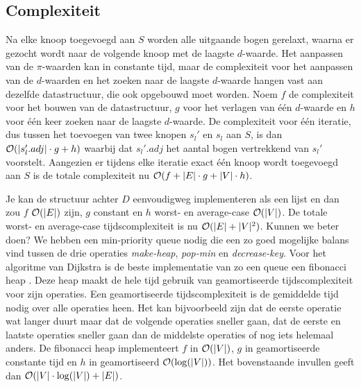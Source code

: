 \documentclass[conference]{IEEEtran}
\theoremstyle{definition}
\theoremstyle{remark}
\DeclarePairedDelimiter{\card}{\vert}{\vert}  %
\begin{document}
\subsection{Complexiteit}
Na elke knoop toegevoegd aan $S$ worden alle uitgaande bogen gerelaxt, waarna er gezocht wordt naar de volgende knoop met de laagste $d$-waarde. Het aanpassen van de $\pi$-waarden kan in constante tijd, maar de complexiteit voor het aanpassen van de $d$-waarden en het zoeken naar de laagste $d$-waarde hangen vast aan dezelfde datastructuur, die ook opgebouwd moet worden. Noem $f$ de complexiteit voor het bouwen van de datastructuur, $g$ voor het verlagen van één $d$-waarde en $h$ voor één keer zoeken naar de laagste $d$-waarde. De complexiteit voor één iteratie, dus tussen het toevoegen van twee knopen $s_l'$ en $s_l$ aan $S$, is dan $\mathcal{O}(\card{s_l'.adj} \cdot g + h)$ waarbij dat $s_l'.adj$ het aantal bogen vertrekkend van $s_l'$ voorstelt. Aangezien er tijdens elke iteratie exact één knoop wordt toegevoegd aan $S$ is de totale complexiteit nu $\mathcal{O}(f + \card{E} \cdot g + \card{V} \cdot h)$.

Je kan de structuur achter $D$ eenvoudigweg implementeren als een lijst en dan zou $f$ $\mathcal{O}(\card{E})$ zijn, $g$ constant en $h$ worst- en average-case $\mathcal{O}(\card{V})$. De totale worst- en average-case tijdscomplexiteit is nu $\mathcal{O}(\card{E} + \card{V}^2)$. Kunnen we beter doen? We hebben een min-priority queue nodig die een zo goed mogelijke balans vind tussen de drie operaties \textit{make-heap}, \textit{pop-min} en \textit{decrease-key}. Voor het algoritme van Dijkstra is de beste implementatie van zo een queue een fibonacci heap \cite{Fibonacci}. Deze heap maakt de hele tijd gebruik van geamortiseerde tijdscomplexiteit voor zijn operaties. Een geamortiseerde tijdscomplexiteit is de gemiddelde tijd nodig over alle operaties heen. Het kan bijvoorbeeld zijn dat de eerste operatie wat langer duurt maar dat de volgende operaties sneller gaan, dat de eerste en laatste operaties sneller gaan dan de middelste operaties of nog iets helemaal anders. De fibonacci heap implementeert $f$ in $\mathcal{O}(\card{V})$, $g$ in geamortiseerde constante tijd en $h$ in geamortiseerd $\mathcal{O}(\log(\card{V}))$. Het bovenstaande invullen geeft dan $\mathcal{O}(\card{V} \cdot \log(\card{V}) + \card{E})$.
\end{document}
